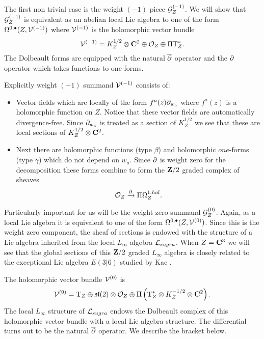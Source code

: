 \parsec[s:weight-1]

The first non trivial case is the weight $(-1)$ piece $\mathcal G_Z^{(-1)}$.
We will show that
$\mathcal G_Z^{(-1)}$ is equivalent as an abelian local Lie algebra to one of the form $\Omega^{0,\bullet}(Z, \mathcal V^{(-1)})$ where $\mathcal V^{(-1)}$ is the holomorphic vector bundle
\[
\mathcal V^{(-1)} = K^{1/2}_Z \otimes \mathbf{C}^2 \oplus \mathcal O_Z \oplus \Pi {\rm T}^*_Z .
\]
The Dolbeault forms are equipped with the natural $\overline{\partial}$ operator and the $\partial$ operator which takes functions to one-forms.

Explicitly weight $(-1)$ summand $\mathcal V^{(-1)}$ consists of:
\begin{itemize}
\item 
Vector fields which are locally of the form $f^a(z) \partial_{w_a}$ where $f^{a}(z)$ is a holomorphic function on $Z$.
Notice that these vector fields are automatically divergence-free.
Since $\partial_{w_a}$ is treated as a section of $K^{1/2}_Z$ we see that these are local sections of $K^{1/2}_Z \otimes \mathbf{C}^2$. 
\item 
Next there are holomorphic functions (type $\beta$) and holomorphic $one$-forms (type $\gamma$) which do not depend on $w_a$. 
Since $\partial$ is weight zero for the decomposition these forms combine to form the $\mathbf{Z}/2$ graded complex of sheaves
\[
\mathcal O_Z \xrightarrow{\partial} \Pi \Omega^{1,hol}_Z .
\]
\end{itemize}

\parsec[s:weight0]


Particularly important for us will be the weight zero summand $\mathcal G_Z^{(0)}$.
Again, as a local Lie algebra it is equivalent to one of the form $\Omega^{0,\bullet}(Z, \mathcal V^{(0)})$.
Since this is the weight zero component, the sheaf of sections is endowed with the structure of a Lie algebra inherited from the local $L_\infty$ algebra $\mathcal L_{sugra}$.
When $Z = \mathbf{C}^3$ we will see that the global sections of this $\mathbf{Z}/2$ graded $L_\infty$ algebra is closely related to the exceptional Lie algebra $E(3|6)$ studied by Kac \cite{KacClass}.

The holomorphic vector bundle $\mathcal V^{(0)}$ is 
\[
\mathcal V^{(0)} = {\rm T}_Z \oplus \mathfrak{sl}(2) \otimes \mathcal O_Z \oplus \Pi \left( {\rm T}^*_Z \otimes K^{-1/2}_Z \otimes \mathbf{C}^2 \right).
\]
The local $L_\infty$ structure of $\mathcal L_{sugra}$ endows the Dolbeault complex of this holomorphic vector bundle with a local Lie algebra structure.
The differential turns out to be the natural $\overline{\partial}$ operator.
We describe the bracket below.

